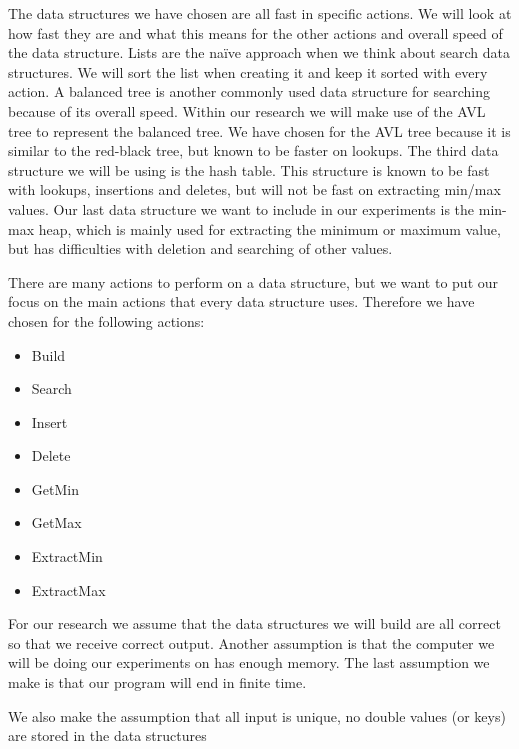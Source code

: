 \documentclass{article}
\begin{document}
The data structures we have chosen are all fast in specific actions. We will look at how fast they are and what this means for the other actions and overall speed of the data structure. 
Lists are the na\"{i}ve approach when we think about search data structures. We will sort the list when creating it and keep it sorted with every action. A balanced tree is another commonly used data structure for searching because of its overall speed. Within our research we will make use of the AVL tree to represent the balanced tree. We have chosen for the AVL tree because it is similar to the red-black tree, but known to be faster on lookups. The third data structure we will be using is the hash table. This structure is known to be fast with lookups, insertions and deletes, but will not be fast on extracting min/max values. Our last data structure we want to include in our experiments is the min-max heap, which is mainly used for extracting the minimum or maximum value, but has difficulties with deletion and searching of other values.
	 
There are many actions to perform on a data structure, but we want to put our focus on the main actions that every data structure uses. Therefore we have chosen for the following actions:
\begin{itemize}
\item Build
\item Search
\item Insert
\item Delete
\item GetMin
\item GetMax
\item ExtractMin
\item ExtractMax
\end{itemize}

For our research we assume that the data structures we will build are all correct so that we receive correct output. Another assumption is that the computer we will be doing our experiments on has enough memory. The last assumption we make is that our program will end in finite time.

We also make the assumption that all input is unique, no double values (or keys) are stored in the data structures
\end{document}
